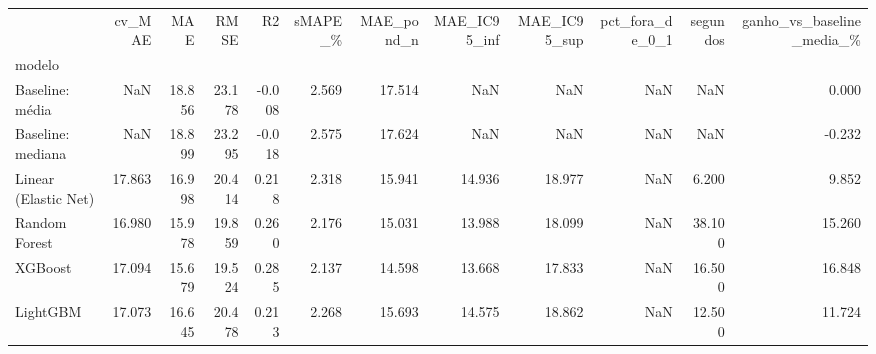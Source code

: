 \begin{tabular}{lrrrrrrrrrrr}
\toprule
 & cv\_MAE & MAE & RMSE & R2 & sMAPE\_\% & MAE\_pond\_n & MAE\_IC95\_inf & MAE\_IC95\_sup & pct\_fora\_de\_0\_1 & segundos & ganho\_vs\_baseline\_media\_\% \\
modelo &  &  &  &  &  &  &  &  &  &  &  \\
\midrule
Baseline: média & NaN & 18.856 & 23.178 & -0.008 & 2.569 & 17.514 & NaN & NaN & NaN & NaN & 0.000 \\
Baseline: mediana & NaN & 18.899 & 23.295 & -0.018 & 2.575 & 17.624 & NaN & NaN & NaN & NaN & -0.232 \\
Linear (Elastic Net) & 17.863 & 16.998 & 20.414 & 0.218 & 2.318 & 15.941 & 14.936 & 18.977 & NaN & 6.200 & 9.852 \\
Random Forest & 16.980 & 15.978 & 19.859 & 0.260 & 2.176 & 15.031 & 13.988 & 18.099 & NaN & 38.100 & 15.260 \\
XGBoost & 17.094 & 15.679 & 19.524 & 0.285 & 2.137 & 14.598 & 13.668 & 17.833 & NaN & 16.500 & 16.848 \\
LightGBM & 17.073 & 16.645 & 20.478 & 0.213 & 2.268 & 15.693 & 14.575 & 18.862 & NaN & 12.500 & 11.724 \\
\bottomrule
\end{tabular}
